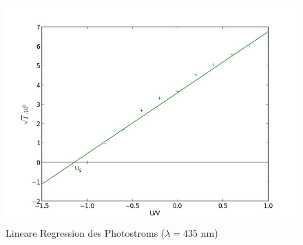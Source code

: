 	\begin{figure}[h]
		\begin{center}
		\includegraphics[scale=0.7]{picavio1lin.jpg}
		\caption{Lineare Regression des Photostroms ($\lambda=435$ nm)}
		\label{picavio1lin}
		\end{center}	
	\end{figure}